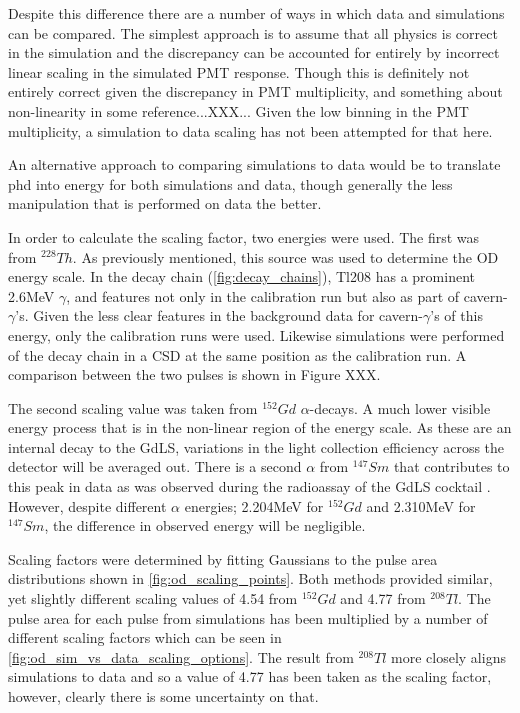 

\par
Despite this difference there are a number of ways in which data and simulations can be compared.
The simplest approach is to assume that all physics is correct in the simulation and the discrepancy can be accounted for entirely by incorrect linear scaling in the simulated PMT response.
Though this is definitely not entirely correct given the discrepancy in PMT multiplicity, and something about non-linearity in some reference...XXX...
Given the low binning in the PMT multiplicity, a simulation to data scaling has not been attempted for that here.
\par
An alternative approach to comparing simulations to data would be to translate phd into energy for both simulations and data, though generally the less manipulation that is performed on data the better.

\par
In order to calculate the scaling factor, two energies were used.
The first was from ${}^{228}Th$.
As previously mentioned, this source was used to determine the OD energy scale.
In the decay chain (\autoref{fig:decay_chains}), Tl208 has a prominent 2.6MeV $\gamma$, and features not only in the calibration run but also as part of cavern-$\gamma$'s.
Given the less clear features in the background data for cavern-$\gamma$'s of this energy, only the calibration runs were used.
Likewise simulations were performed of the decay chain in a CSD at the same position as the calibration run.
A comparison between the two pulses is shown in Figure XXX.
\par
The second scaling value was taken from ${}^{152}Gd$ $\alpha$-decays.
A much lower visible energy process that is in the non-linear region of the energy scale.
As these are an internal decay to the GdLS, variations in the light collection efficiency across the detector will be averaged out.
There is a second $\alpha$ from ${}^{147}Sm$ that contributes to this peak in data as was observed during the radioassay of the GdLS cocktail \cite{scotthaselschwardt_thesis_ref}.
However, despite different $\alpha$ energies; 2.204MeV for ${}^{152}Gd$ and 2.310MeV for ${}^{147}Sm$, the difference in observed energy will be negligible.

\par
Scaling factors were determined by fitting Gaussians to the pulse area distributions shown in \autoref{fig:od_scaling_points}.
Both methods provided similar, yet slightly different scaling values of 4.54 from ${}^{152}Gd$ and 4.77 from ${}^{208}Tl$.
The pulse area for each pulse from simulations has been multiplied by a number of different scaling factors which can be seen in \autoref{fig:od_sim_vs_data_scaling_options}.
The result from ${}^{208}Tl$ more closely aligns simulations to data and so a value of 4.77 has been taken as the scaling factor, however, clearly there is some uncertainty on that.






